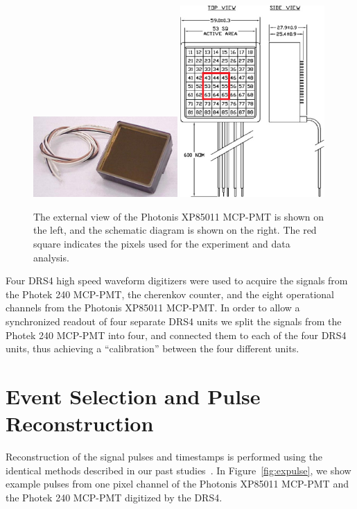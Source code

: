 \documentclass[12pt]{article}
\begin{document}
\begin{figure}[htbp] 
\centering
\includegraphics[width=0.49\textwidth]{Images/photonis/photonis.jpg}
\includegraphics[width=0.49\textwidth]{Images/photonis/photonis2.png}
\caption{The external view of the Photonis XP85011 MCP-PMT is shown on the left, and
the schematic diagram is shown on the right. The red square indicates the pixels
used for the experiment and data analysis.} 
\label{fig:photonis} 
\end{figure}

Four DRS4 high speed waveform digitizers were used to acquire the signals from
the Photek 240 MCP-PMT, the cherenkov counter, and the eight operational
channels from the Photonis XP85011 MCP-PMT. In order to allow a synchronized
readout of four separate DRS4 units we split the signals from the Photek 240
MCP-PMT into four, and connected them to each of the four DRS4 units, thus achieving
a ``calibration'' between the four different units.  



\section{Event Selection and Pulse Reconstruction}
\label{sec:reconstruction}
Reconstruction of the signal pulses and timestamps is performed using the
identical methods described in our past
studies~\cite{Anderson:2015gha,MCPFastCaloNIMA,Ronzhin:2015pba}.
In Figure~\ref{fig:expulse}, we show example pulses from one pixel channel of
the Photonis XP85011 MCP-PMT and the Photek 240 MCP-PMT digitized by the DRS4.
\end{document}
